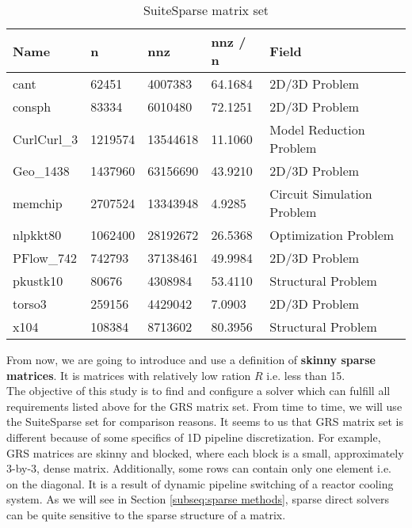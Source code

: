 \begin{table}[ht]
\centering
\begin{tabular}{|l|l|l|l|l|}
\hline
Name        & n       & nnz      & nnz / n & Field                      \\ \hline
cant        & 62451   & 4007383  & 64.1684 & 2D/3D Problem              \\ \hline
consph      & 83334   & 6010480  & 72.1251 & 2D/3D Problem              \\ \hline
CurlCurl\_3 & 1219574 & 13544618 & 11.1060 & Model Reduction Problem    \\ \hline
Geo\_1438   & 1437960 & 63156690 & 43.9210 & 2D/3D Problem              \\ \hline
memchip     & 2707524 & 13343948 & 4.9285  & Circuit Simulation Problem \\ \hline
nlpkkt80    & 1062400 & 28192672 & 26.5368 & Optimization Problem       \\ \hline
PFlow\_742  & 742793  & 37138461 & 49.9984 & 2D/3D Problem              \\ \hline
pkustk10    & 80676   & 4308984  & 53.4110 & Structural Problem         \\ \hline
torso3      & 259156  & 4429042  & 7.0903  & 2D/3D Problem              \\ \hline
x104        & 108384  & 8713602  & 80.3956 & Structural Problem         \\ \hline
\end{tabular}
\caption{SuiteSparse matrix set}
\label{table:suite-sparse-matrix-set}
\end{table}


From now, we are going to introduce and use a definition of \textbf{skinny sparse matrices}. It is matrices with relatively low  ration $R$ i.e. less than 15. \\ 


The objective of this study is to find and configure a solver which can fulfill all requirements listed above for the GRS matrix set. From time to time, we will use the SuiteSparse set for comparison reasons. It seems to us that GRS matrix set is different because of some specifics of 1D pipeline discretization. For example, GRS matrices are skinny and blocked, where each block is a small, approximately 3-by-3, dense matrix. Additionally, some rows can contain only one element i.e. on the diagonal. It is a result of dynamic pipeline switching of a reactor cooling system. As we will see in Section \ref{subseq:sparse methods}, sparse direct solvers can be quite sensitive to the sparse structure of a matrix.\\



